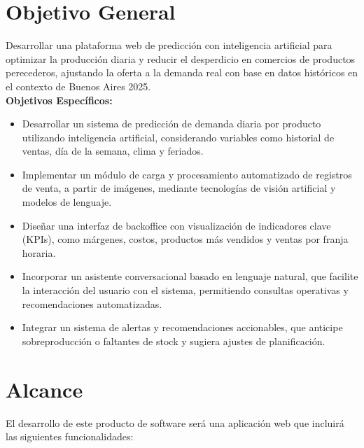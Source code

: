 \section{Objetivo General}

Desarrollar una plataforma web de predicción con inteligencia artificial para optimizar la producción diaria y reducir el desperdicio en comercios de productos perecederos, ajustando la oferta a la demanda real con base en datos históricos en el contexto de Buenos Aires 2025.\\

\noindent\textbf{Objetivos Específicos:}

\begin{itemize}
    \item Desarrollar un sistema de predicción de demanda diaria por producto utilizando inteligencia artificial, considerando variables como historial de ventas, día de la semana, clima y feriados.
    
    \item Implementar un módulo de carga y procesamiento automatizado de registros de venta, a partir de imágenes, mediante tecnologías de visión artificial y modelos de lenguaje.
    
    \item Diseñar una interfaz de backoffice con visualización de indicadores clave (KPIs), como márgenes, costos, productos más vendidos y ventas por franja horaria.
    
    \item Incorporar un asistente conversacional basado en lenguaje natural, que facilite la interacción del usuario con el sistema, permitiendo consultas operativas y recomendaciones automatizadas.
    
    \item Integrar un sistema de alertas y recomendaciones accionables, que anticipe sobreproducción o faltantes de stock y sugiera ajustes de planificación.
    
\end{itemize}

\section{Alcance}

El desarrollo de este producto de software será una aplicación web que incluirá las siguientes funcionalidades:

